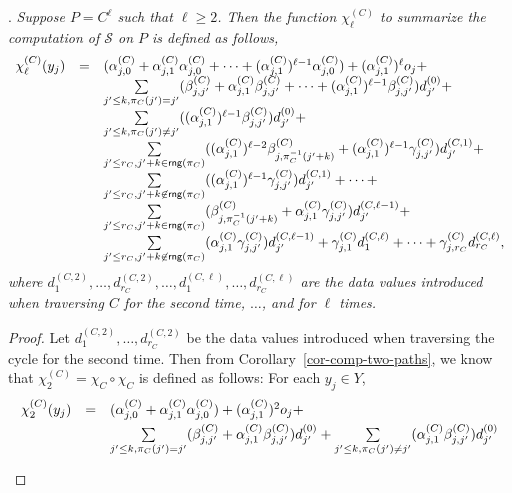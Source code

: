 \documentclass[runningheads,a4paper]{llncs}
\def\Ss{{\mathcal{S} }}
\newcommand\rng{\mathsf{rng}}
\begin{document}
\begin{appendix}
.
{\it Suppose $P=C^{\ell}$ such that $\ell \ge 2$. Then the function $\chi^{(C)}_{\ell}$ to summarize the computation of $\Ss$ on $P$ is defined as follows,
\[
\begin{array}{l c l}
\chi^{(C)}_{\ell}(y_j)  & = & (\alpha^{(C)}_{j,0} + \alpha^{(C)}_{j,1} \alpha^{(C)}_{j,0}+ \dots +(\alpha^{(C)}_{j,1})^{\ell-1} \alpha^{(C)}_{j,0}) + (\alpha^{(C)}_{j,1})^\ell o_j + \\
& & \sum \limits_{j' \le k, \pi_C(j')=j'} (\beta^{(C)}_{j,j'}+\alpha^{(C)}_{j,1}\beta^{(C)}_{j,j'} + \dots +(\alpha^{(C)}_{j,1})^{\ell-1}  \beta^{(C)}_{j,j'}) d^{(0)}_{j'} + \\
%
& & \sum \limits_{j'\le k, \pi_C(j') \neq j'} ((\alpha^{(C)}_{j,1})^{\ell-1} \beta^{(C)}_{j,j'}) d^{(0)}_{j'} +  \\
%
& & \sum \limits_{j' \le r_C, j'+k \in \rng(\pi_C)} ( (\alpha^{(C)}_{j,1})^{\ell-2} \beta^{(C)}_{j, \pi_C^{-1}(j'+k)} +(\alpha^{(C)}_{j,1})^{\ell-1}\gamma^{(C)}_{j,j'}) d^{(C,1)}_{j'} + \\
%
& & \sum \limits_{j' \le r_C,  j'+k \not \in \rng(\pi_C)} ((\alpha^{(C)}_{j,1})^{\ell-1} \gamma^{(C)}_{j,j'}) d^{(C,1)}_{j'} + \dots + \\
%
& & \sum \limits_{j' \le r_C, j'+k \in \rng(\pi_C)} (\beta^{(C)}_{j, \pi_C^{-1}(j'+k)}+\alpha^{(C)}_{j,1}\gamma^{(C)}_{j,j'}) d^{(C,\ell-1)}_{j'} + \\
%
& & \sum \limits_{j' \le r_C,  j'+k \not \in \rng(\pi_C)} (\alpha^{(C)}_{j,1} \gamma^{(C)}_{j,j'}) d^{(C,\ell-1)}_{j'} + \gamma^{(C)}_{j, 1} d^{(C,\ell)}_{1} + \dots + \gamma^{(C)}_{j,r_C} d^{(C,\ell)}_{r_C},
\end{array} 
\]
where $d^{(C,2)}_{1},\dots, d^{(C,2)}_{r_C},\dots, d^{(C,\ell)}_{1},\dots,d^{(C,\ell)}_{r_C}$
 are the data values introduced when traversing $C$ for the second time, $\dots$, and for $\ell$ times.
}
%
\begin{proof}
Let $d^{(C,2)}_{1},\dots,d^{(C,2)}_{r_C}$ be the data values introduced when traversing the cycle for the second time. Then from Corollary~\ref{cor-comp-two-paths}, we know that $\chi^{(C)}_2 = \chi_{C} \circ \chi_C$ is defined as follows: For each $y_j \in Y$,
\[
\begin{array}{l c l}
\smallskip
\chi^{(C)}_2(y_j) & =  & (\alpha^{(C)}_{j,0}+\alpha^{(C)}_{j,1} \alpha^{(C)}_{j,0})+ (\alpha^{(C)}_{j,1})^2 o_j + \\
%
\smallskip
& & \sum \limits_{j' \le k, \pi_C(j')=j'} (\beta^{(C)}_{j,j'}+\alpha^{(C)}_{j,1} \beta^{(C)}_{j,j'}) d^{(0)}_{j'} + \sum \limits_{j' \le k, \pi_C(j') \neq j'} (\alpha^{(C)}_{j,1} \beta^{(C)}_{j,j'}) d^{(0)}_{j'}  \\

\end{array}\]
\end{proof}
\end{appendix}
\end{document}
